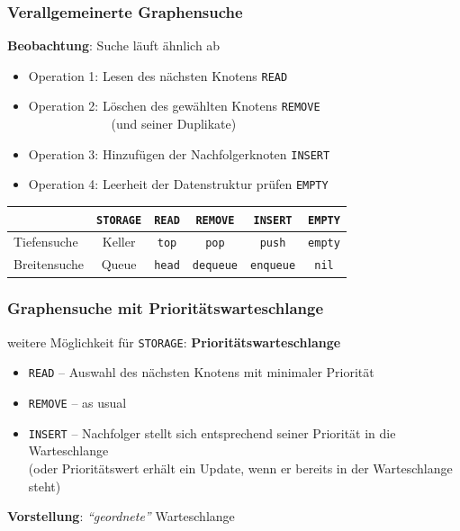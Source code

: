 \documentclass{beamer}
\begin{document}
\begin{frame} \frametitle{Verallgemeinerte Graphensuche}
	\small
	\textbf{Beobachtung}: Suche läuft ähnlich ab
	\begin{itemize}
		\item Operation 1: Lesen des nächsten Knotens \hfill \texttt{READ}
		\item Operation 2: Löschen des gewählten Knotens \hfill \texttt{REMOVE} \\ $\phantom{Operation 2: \enskip}$ \textcolor{cdgray!50}{(und seiner Duplikate)} 
		\item Operation 3: Hinzufügen der Nachfolgerknoten \hfill \texttt{INSERT}
		\item Operation 4: Leerheit der Datenstruktur prüfen \hfill \texttt{EMPTY}
	\end{itemize}
	
	\pause
	\begin{center}
		\begin{tabular}{l|ccccc}
			& \texttt{STORAGE} & \texttt{READ} & \texttt{REMOVE} & \texttt{INSERT} & \texttt{EMPTY} \\ \hline
			Tiefensuche & Keller & \texttt{top} & \texttt{pop} & \texttt{push} & \texttt{empty} \\
			Breitensuche & Queue & \texttt{head} & \texttt{dequeue} & \texttt{enqueue} & \texttt{nil} \\
		\end{tabular}
	\end{center}
\end{frame}

\begin{frame} \frametitle{Graphensuche mit Prioritätswarteschlange}
	\small
	weitere Möglichkeit für \texttt{STORAGE}: \textbf{Prioritätswarteschlange}
	\begin{itemize}
		\item \texttt{READ} -- Auswahl des nächsten Knotens mit minimaler Priorität 
		\item \texttt{REMOVE} -- as usual
		\item \texttt{INSERT} -- Nachfolger stellt sich entsprechend seiner Priorität in die Warteschlange \\ (oder Prioritätswert erhält ein Update, wenn er bereits in der Warteschlange steht)
	\end{itemize}

	\textbf{Vorstellung}: \textit{\enquote{geordnete}} Warteschlange
\end{frame}
\end{document}
